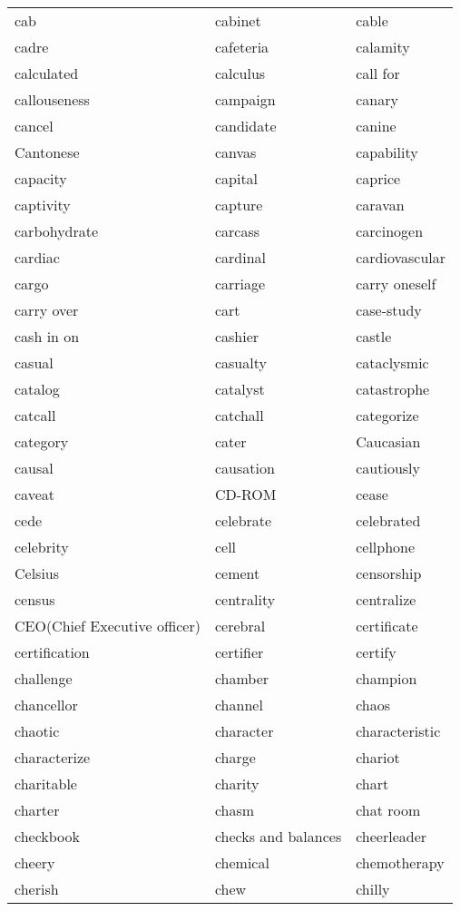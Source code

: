 \documentclass{minimal}
\begin{document}
\begin{longtable}{p{2.8cm}p{2.8cm}p{2.8cm}}
cab & cabinet & cable \\
cadre & cafeteria & calamity \\
calculated & calculus & call for \\
callouseness & campaign & canary \\
cancel & candidate & canine \\
Cantonese & canvas & capability \\
capacity & capital & caprice \\
captivity & capture & caravan \\
carbohydrate & carcass & carcinogen \\
cardiac & cardinal & cardiovascular \\
cargo & carriage & carry oneself \\
carry over & cart & case-study \\
cash in on & cashier & castle \\
casual & casualty & cataclysmic \\
catalog & catalyst & catastrophe \\
catcall & catchall & categorize \\
category & cater & Caucasian \\
causal & causation & cautiously \\
caveat & CD-ROM & cease \\
cede & celebrate & celebrated \\
celebrity & cell & cellphone \\
Celsius & cement & censorship \\
census & centrality & centralize \\
CEO(Chief Executive officer) & cerebral & certificate \\
certification & certifier & certify \\
challenge & chamber & champion \\
chancellor & channel & chaos \\
chaotic & character & characteristic \\
characterize & charge & chariot \\
charitable & charity & chart \\
charter & chasm & chat room \\
checkbook & checks and balances & cheerleader \\
cheery & chemical & chemotherapy \\
cherish & chew & chilly \\

\end{longtable}
\end{document}
